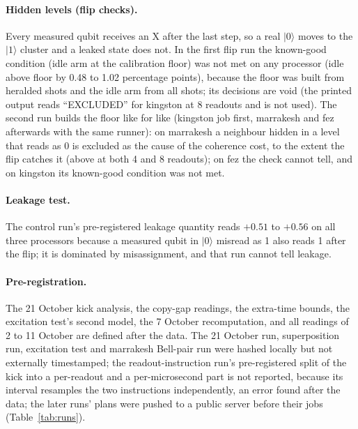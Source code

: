 \documentclass[reprint,amsmath,amssymb,aps,superscriptaddress,nofootinbib]{revtex4-2}
\begin{document}
\paragraph*{Hidden levels (flip checks).} Every measured qubit receives an X after the last step, so a real $|0\rangle$ moves to the $|1\rangle$ cluster and a leaked state does not. In the first flip run the known-good condition (idle arm at the calibration floor) was not met on any processor (idle above floor by 0.48 to 1.02 percentage points), because the floor was built from heralded shots and the idle arm from all shots; its decisions are void (the printed output reads ``EXCLUDED'' for kingston at 8 readouts and is not used). The second run builds the floor like for like (kingston job first, marrakesh and fez afterwards with the same runner): on marrakesh a neighbour hidden in a level that reads as 0 is excluded as the cause of the coherence cost, to the extent the flip catches it (above at both 4 and 8 readouts); on fez the check cannot tell, and on kingston its known-good condition was not met.

\paragraph*{Leakage test.} The control run's pre-registered leakage quantity reads $+0.51$ to $+0.56$ on all three processors because a measured qubit in $|0\rangle$ misread as 1 also reads 1 after the flip; it is dominated by misassignment, and that run cannot tell leakage.

\paragraph*{Pre-registration.} The 21 October kick analysis, the copy-gap readings, the extra-time bounds, the excitation test's second model, the 7 October recomputation, and all readings of 2 to 11 October are defined after the data. The 21 October run, superposition run, excitation test and marrakesh Bell-pair run were hashed locally but not externally timestamped; the readout-instruction run's pre-registered split of the kick into a per-readout and a per-microsecond part is not reported, because its interval resamples the two instructions independently, an error found after the data; the later runs' plans were pushed to a public server before their jobs (Table~\ref{tab:runs}).
\end{document}
